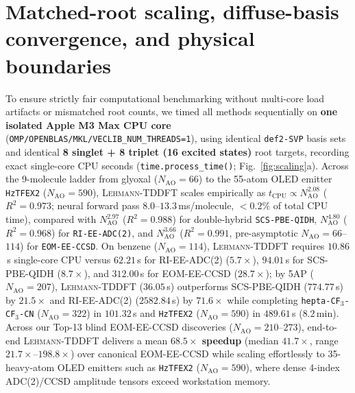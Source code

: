 \documentclass[10pt,twocolumn]{article}
\theoremstyle{natthm}
\newcommand{\leh}{\textsc{Lehmann-TDDFT}}
\begin{document}
\section*{Matched-root scaling, diffuse-basis convergence, and physical boundaries}
To ensure strictly fair computational benchmarking without multi-core load artifacts or mismatched root counts, we timed all methods sequentially on \textbf{one isolated Apple M3 Max CPU core} (\texttt{OMP/OPENBLAS/MKL/VECLIB\_NUM\_THREADS=1}), using identical \texttt{def2-SVP} basis sets and identical \textbf{8 singlet + 8 triplet (16 excited states)} root targets, recording exact single-core CPU seconds (\texttt{time.process\_time()}; Fig.~\ref{fig:scaling}a).
Across the 9-molecule ladder from glyoxal ($N_{\mathrm{AO}}=66$) to the 55-atom OLED emitter \texttt{HzTFEX2} ($N_{\mathrm{AO}}=590$), \leh{} scales empirically as $t_{\mathrm{CPU}}\propto N_{\mathrm{AO}}^{2.08}$ ($R^2=0.973$; neural forward pass $8.0$--$13.3$\,ms/molecule, $<0.2\%$ of total CPU time), compared with $N_{\mathrm{AO}}^{2.97}$ ($R^2=0.988$) for double-hybrid \texttt{SCS-PBE-QIDH}, $N_{\mathrm{AO}}^{4.80}$ ($R^2=0.968$) for \texttt{RI-EE-ADC(2)}, and $N_{\mathrm{AO}}^{3.66}$ ($R^2=0.991$, pre-asymptotic $N_{\mathrm{AO}}=66$--$114$) for \texttt{EOM-EE-CCSD}. On benzene ($N_{\mathrm{AO}}=114$), \leh{} requires $10.86$\,s single-core CPU versus $62.21$\,s for RI-EE-ADC(2) ($5.7\times$), $94.01$\,s for SCS-PBE-QIDH ($8.7\times$), and $312.00$\,s for EOM-EE-CCSD (\textbf{$28.7\times$}); by 5AP ($N_{\mathrm{AO}}=207$), \leh{} ($36.05$\,s) outperforms SCS-PBE-QIDH ($774.77$\,s) by \textbf{$21.5\times$} and RI-EE-ADC(2) ($2582.84$\,s) by \textbf{$71.6\times$} while completing \texttt{hepta-CF$_3$-CF$_3$-CN} ($N_{\mathrm{AO}}=322$) in $101.32$\,s and \texttt{HzTFEX2} ($N_{\mathrm{AO}}=590$) in $489.61$\,s ($8.2$\,min).
Across our Top-13 blind EOM-EE-CCSD discoveries ($N_{\mathrm{AO}}=210$--$273$), end-to-end \leh{} delivers a mean \textbf{$68.5\times$ speedup} (median $41.7\times$, range $21.7\times$--$198.8\times$) over canonical EOM-EE-CCSD while scaling effortlessly to 35-heavy-atom OLED emitters such as \texttt{HzTFEX2}\cite{aizawa2022} ($N_{\mathrm{AO}}=590$), where dense 4-index ADC(2)/CCSD amplitude tensors exceed workstation memory.
\end{document}
